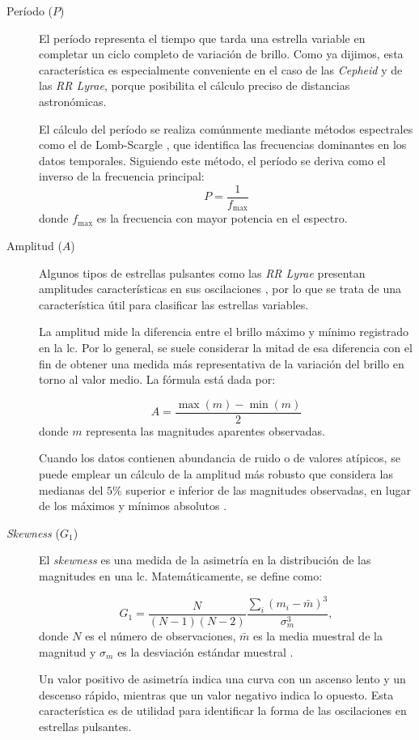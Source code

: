 \begin{description}
    \item[Período ($P$)]
    El período representa el tiempo que tarda una estrella variable en completar un ciclo completo de variación de brillo. Como ya dijimos, esta característica es especialmente conveniente en el caso de las \emph{Cepheid} y de las \emph{RR Lyrae}, porque posibilita el cálculo preciso de distancias astronómicas.
    
    El cálculo del período se realiza comúnmente mediante métodos espectrales como el de Lomb-Scargle \citep{lomb1976ls}, que identifica las frecuencias dominantes en los datos temporales. Siguiendo este método, el período se deriva como el inverso de la frecuencia principal:
    \[
    P = \frac{1}{f_{\max}}
    \]
    donde $f_{\max}$ es la frecuencia con mayor potencia en el espectro.

    \item[Amplitud ($A$)]
    Algunos tipos de estrellas pulsantes como las \emph{RR Lyrae} presentan amplitudes características en sus oscilaciones \citep{dallora2006rrlyraedistancescale}, por lo que se trata de una característica útil para clasificar las estrellas variables.
    
    La amplitud mide la diferencia entre el brillo máximo y mínimo registrado en la \gls{lc}. Por lo general, se suele considerar la mitad de esa diferencia con el fin de obtener una medida más representativa de la variación del brillo en torno al valor medio. La fórmula está dada por:
    
    \[
    A = \frac{\max{(m)} - \min{(m)}}{2}
    \]
    donde $m$ representa las magnitudes aparentes observadas.
    
    Cuando los datos contienen abundancia de ruido o de valores atípicos, se puede emplear un cálculo de la amplitud más robusto que considera las medianas del $5\%$ superior e inferior de las magnitudes observadas, en lugar de los máximos y mínimos absolutos \citep{richards2011timeseries}.
    
    \item[\emph{Skewness} ($G_1$)]
    El \emph{skewness} es una medida de la asimetría en la distribución de las magnitudes en una \gls{lc}. Matemáticamente, se define como:
    
    \[
    G_1 = \frac{N}{(N - 1)(N - 2)} \frac{\sum_i(m_i - \bar{m})^3}{\sigma_m^3},
    \]
    donde $N$ es el número de observaciones, $\bar{m}$ es la media muestral de la magnitud y $\sigma_m$ es la desviación estándar muestral \citep{joanes1998skewnesskurtosis}.
    
    Un valor positivo de asimetría indica una curva con un ascenso lento y un descenso rápido, mientras que un valor negativo indica lo opuesto. Esta característica es de utilidad para identificar la forma de las oscilaciones en estrellas pulsantes.
\end{description}

